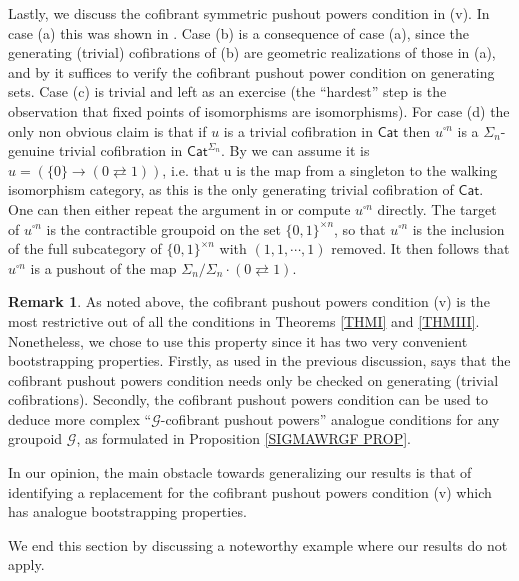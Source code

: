 \documentclass[a4paper,10pt
,draft
]{article}%
\numberwithin{equation}{section}
\numberwithin{figure}{section}
\theoremstyle{definition} %
\newtheorem{remark}[equation]{Remark}%
\newcommand{\G}{\ensuremath{\mathcal G}}
\newcommand{\1}{\ensuremath{\mathbbm 1}}%
\begin{document}
Lastly, we discuss the cofibrant symmetric pushout powers condition in (v).
In case (a) this was shown in 
\cite[Ex. 6.18]{BP_geo}.
Case (b) is a consequence of case (a), 
since the generating (trivial) cofibrations of (b) are geometric realizations of those in (a),
and by \cite[Rmk. 6.17]{BP_geo}
it suffices to verify the cofibrant pushout power condition
on generating sets.
Case (c) is trivial and left as an exercise 
(the ``hardest'' step is the observation that fixed points of isomorphisms are isomorphisms).
For case (d) the only non obvious claim is that
if $u$ is a trivial cofibration in $\mathsf{Cat}$
then $u^{\square n}$
is a $\Sigma_n$-genuine trivial cofibration in $\mathsf{Cat}^{\Sigma_n}$.
By \cite[Rmk. 6.17]{BP_geo}
we can assume it is $u = \left(\{0\} \to (0\rightleftarrows 1)\right)$,
i.e. that u is the map from a singleton to the walking isomorphism category,
as this is the only generating trivial cofibration of 
$\mathsf{Cat}$.
One can then either repeat the argument in \cite[Ex. 6.18]{BP_geo}
or compute $u^{\square n}$ directly.
The target of $u^{\square n}$
is the contractible groupoid on the set $\{0,1\}^{\times n}$,
so that $u^{\square n}$
is the inclusion of the full subcategory of 
$\{0,1\}^{\times n}$
with $(1,1,\cdots,1)$ removed.
It then follows that $u^{\square n}$
is a pushout of the map
$\Sigma_n/\Sigma_n \cdot (0 \rightleftarrows 1)$.




\begin{remark}\label{CPPWHY REM}
	As noted above, the cofibrant pushout powers
	condition (v) is the most restrictive 
	out of all the conditions in 
	Theorems \ref{THMI} and \ref{THMIII}.
	Nonetheless, we chose to use this property 
	since it has two very convenient bootstrapping properties.
	Firstly, as used in the previous discussion, \cite[Rmk. 6.17]{BP_geo}
	says that the cofibrant pushout powers condition needs only be checked on generating (trivial cofibrations).
	Secondly, the cofibrant pushout powers condition 
	can be used to deduce more complex
	``$\G$-cofibrant pushout powers'' analogue conditions for any groupoid $\G$,
	as formulated in Proposition \ref{SIGMAWRGF PROP}.
	
	In our opinion, the main obstacle towards generalizing our results is that of identifying 
	a replacement for the cofibrant pushout powers condition (v)
	which has analogue bootstrapping properties.
\end{remark}



We end this section by discussing a noteworthy 
example where our results do not apply.
\end{document}
